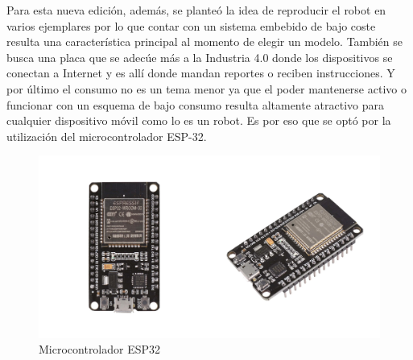 Para esta nueva edición, además, se planteó la idea de reproducir el robot en varios ejemplares por lo que contar con un sistema embebido de bajo coste resulta una característica principal al momento de elegir un modelo. También se busca una placa que se adecúe más a la Industria 4.0 donde los dispositivos se conectan a Internet y es allí donde mandan reportes o reciben instrucciones. Y por último el consumo no es un tema menor ya que el poder mantenerse activo o funcionar con un esquema de bajo consumo resulta altamente atractivo para cualquier dispositivo móvil como lo es un robot. Es por eso que se optó por la utilización del microcontrolador ESP-32. \cite{kolban2017kolban}

\begin{figure}[H]
   \centering
   \includegraphics[width=0.7\linewidth]{images/esp32-micro.jpg}
   \caption{Microcontrolador ESP32}
   \label{fig:microcontrolador}
\end{figure}